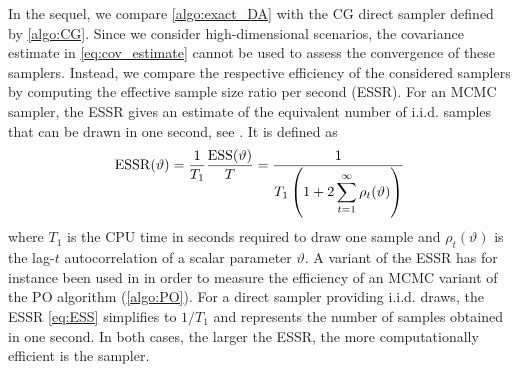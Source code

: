 \documentclass[nohypdvips,onefignum,onetabnum]{siamart171218}
\begin{document}
In the sequel, we compare \cref{algo:exact_DA} with the CG direct sampler defined by \cref{algo:CG}.
Since we consider high-dimensional scenarios, the covariance estimate in \cref{eq:cov_estimate} cannot be used to assess the convergence of these samplers.
Instead, we compare the respective efficiency of the considered samplers by computing the effective sample size ratio per second (ESSR).
For an MCMC sampler, the ESSR gives an estimate of the equivalent number of i.i.d. samples that can be drawn in one second, see \cite{Kass1998,Liu2001}.
It is defined as
\begin{equation}
  \mathrm{ESSR}(\vartheta) = \dfrac{1}{T_1}\dfrac{\mathrm{ESS}(\vartheta)}{T} =  \dfrac{1}{T_1\pr{1 + 2 \displaystyle\sum_{t=1}^\infty \rho_t(\vartheta)}} \label{eq:ESS}
\end{equation}
where $T_1$ is the CPU time in seconds required to draw one sample and $\rho_t(\vartheta)$ is the lag-$t$ autocorrelation of a scalar parameter $\vartheta$.
A variant of the ESSR has for instance been used in \cite{Gilavert2015} in order to measure the efficiency of an MCMC variant of the PO algorithm (\cref{algo:PO}).
For a direct sampler providing i.i.d. draws, the ESSR \cref{eq:ESS} simplifies to $1/T_1$ and represents the number of samples obtained in one second. 
In both cases, the larger the ESSR, the more computationally efficient is the sampler.
\end{document}
